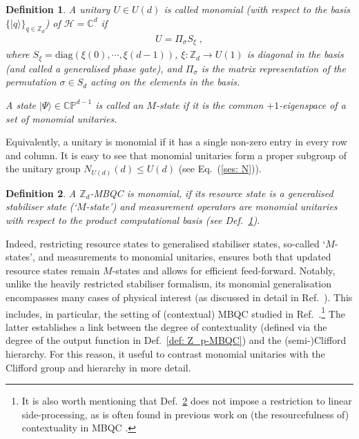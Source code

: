 \documentclass[aps,pra,letterpaper,onrcolumn,nofootinbib,notitlepage,longbibliography]{revtex4-1}
\newtheorem{definition}{Definition}
\newcommand{\mf}[1]{#1}
\newcommand{\ra}{\ensuremath{\rightarrow}}
\newcommand{\zz}{\mathbb Z}
\newcommand{\C}{\mathbb C}
\newcommand\mc[1]{\mathcal{#1}}
\newcommand{\cH}{\mc{H}}
\begin{document}
\begin{definition}\label{def: monomials}
    A unitary $U\in U(d)$ is called \emph{monomial (with respect to the basis $\{|q\rangle\}_{q\in\zz_d}$) of $\cH=\C^d$} if
    \begin{align*}
        U=\Pi_\sigma S_\xi\; ,
    \end{align*}
    where \mf{$S_\xi=\mathrm{diag}(\xi(0),\cdots,\xi(d-1))$, $\xi:\zz_d\ra U(1)$} is diagonal in the basis (and called a \emph{generalised phase gate}), and $\Pi_\sigma$ is the matrix representation of the permutation $\sigma\in S_d$ acting on the elements in the basis.
    
    A state $|\Psi\rangle\in\mathbb{CP}^{d-1}$ is called an \emph{$M$-state} if it is the common $+1$-eigenspace of a set of monomial unitaries.
\end{definition}

Equivalently, a unitary is monomial if it has a single non-zero entry in every row and column. It is easy to see that monomial unitaries form a proper subgroup of the unitary group $N_{U(d)}(d)\leq U(d)$ (see Eq.~(\ref{ses: N})).

\begin{definition}\label{def: monomial Z_p-MBQC}
    A $\zz_d$-MBQC is \emph{monomial}, if its resource state is a generalised stabiliser state (`$M$-state') and measurement operators are monomial unitaries with respect to the product computational basis (see Def.~\ref{def: monomials}).
\end{definition}

Indeed, restricting resource states to generalised stabiliser states, so-called `$M$-states', and measurements to monomial unitaries, ensures both that updated resource states remain $M$-states and allows for efficient feed-forward. Notably, unlike the heavily restricted stabiliser formalism, its monomial generalisation encompasses many cases of physical interest (as discussed in detail in Ref.~\cite{VanDenNest2011}). This includes, in particular, the setting of (contextual) MBQC studied in Ref.~\cite{FrembsRobertsCampbellBartlett2022}.\footnote{It is also worth mentioning that Def.~\ref{def: monomial Z_p-MBQC} does not impose a restriction to linear side-processing, as is often found in previous work on (the resourcefulness of) contextuality in MBQC \cite{AndersBrowne2009,Raussendorf2013,FrembsRobertsBartlett2018,FrembsRobertsCampbellBartlett2022}.} The latter establishes a link between the degree of contextuality (defined via the degree of the output function in Def.~\ref{def: Z_p-MBQC}) and the (semi-)Clifford hierarchy. For this reason, it useful to contrast monomial unitaries with the Clifford group and hierarchy in more detail.
\end{document}
